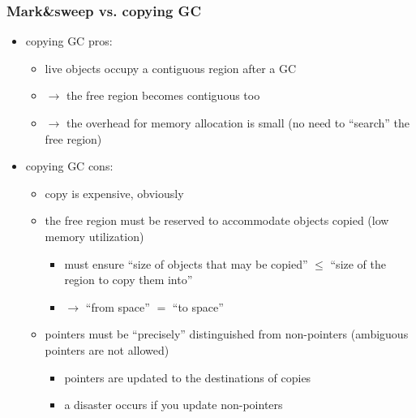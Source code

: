 \documentclass[11pt,dvipdfmx]{beamer}
\newif\ifja
\newif\ifeng
\newcommand{\mura}[1]{{\color{purple}#1}}
\newcommand{\ao}[1]{{\color{blue}#1}}
\begin{document}
\begin{frame}
\frametitle{Mark\&sweep vs. copying GC}
\begin{itemize}
\item copying GC pros:
  \begin{itemize}
  \item live objects occupy a contiguous region after a GC
  \item $\rightarrow$ the free region becomes contiguous too
  \item $\rightarrow$
    \ao{the overhead for memory allocation is small}
    (no need to ``search'' the free region)
  \end{itemize}
\item copying GC cons:
  \begin{itemize}
  \item \mura{copy is expensive}, obviously
  \item \mura{the free region must be reserved} to accommodate objects copied
    (low memory utilization)
    \begin{itemize}
    \item must ensure ``size of objects that may be copied''
      $\leq$ ``size of the region to copy them into''
    \item $\rightarrow$ ``from space'' $=$ ``to space''
    \end{itemize}
  \item pointers must be ``precisely'' distinguished from non-pointers
    (\mura{ambiguous pointers are not allowed})
    \begin{itemize}
    \item pointers are updated to the destinations of copies
    \item a disaster occurs if you update non-pointers
    \end{itemize}
  \end{itemize}
\end{itemize}
\end{frame}
\fi


\ifja
\section{走査型GCのメモリ割り当てコスト(mark-cons比)}
\fi
\ifeng
\end{document}
